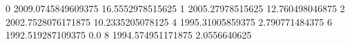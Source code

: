 0 2009.0745849609375 16.5552978515625
1 2005.27978515625 12.760498046875
2 2002.7528076171875 10.2335205078125
4 1995.31005859375 2.790771484375
6 1992.519287109375 0.0
8 1994.574951171875 2.0556640625
